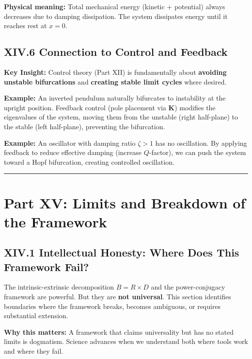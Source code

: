 \documentclass[
]{article}
\begin{document}
\textbf{Physical meaning:} Total mechanical energy (kinetic + potential)
always decreases due to damping dissipation. The system dissipates
energy until it reaches rest at \(x = 0\).

\subsection{XIV.6 Connection to Control and
Feedback}\label{xiv.6-connection-to-control-and-feedback}

\textbf{Key Insight:} Control theory (Part XII) is fundamentally about
\textbf{avoiding unstable bifurcations} and \textbf{creating stable
limit cycles} where desired.

\textbf{Example:} An inverted pendulum naturally bifurcates to
instability at the upright position. Feedback control (pole placement
via \(\mathbf{K}\)) modifies the eigenvalues of the system, moving them
from the unstable (right half-plane) to the stable (left half-plane),
preventing the bifurcation.

\textbf{Example:} An oscillator with damping ratio \(\zeta > 1\) has no
oscillation. By applying feedback to reduce effective damping (increase
\(Q\)-factor), we can push the system toward a Hopf bifurcation,
creating controlled oscillation.

\begin{center}\rule{0.5\linewidth}{0.5pt}\end{center}

\newpage

\section{Part XV: Limits and Breakdown of the
Framework}\label{part-xv-limits-and-breakdown-of-the-framework}

\subsection{XIV.1 Intellectual Honesty: Where Does This Framework
Fail?}\label{xiv.1-intellectual-honesty-where-does-this-framework-fail}

The intrinsic-extrinsic decomposition \(B = R \times D\) and the
power-conjugacy framework are powerful. But they are \textbf{not
universal}. This section identifies boundaries where the framework
breaks, becomes ambiguous, or requires substantial extension.

\textbf{Why this matters:} A framework that claims universality but has
no stated limits is dogmatism. Science advances when we understand both
where tools work and where they fail.
\end{document}
